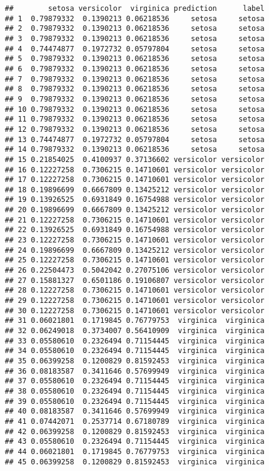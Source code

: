 \documentclass[]{article}
\begin{document}
\begin{verbatim}
##        setosa versicolor  virginica prediction      label
## 1  0.79879332  0.1390213 0.06218536     setosa     setosa
## 2  0.79879332  0.1390213 0.06218536     setosa     setosa
## 3  0.79879332  0.1390213 0.06218536     setosa     setosa
## 4  0.74474877  0.1972732 0.05797804     setosa     setosa
## 5  0.79879332  0.1390213 0.06218536     setosa     setosa
## 6  0.79879332  0.1390213 0.06218536     setosa     setosa
## 7  0.79879332  0.1390213 0.06218536     setosa     setosa
## 8  0.79879332  0.1390213 0.06218536     setosa     setosa
## 9  0.79879332  0.1390213 0.06218536     setosa     setosa
## 10 0.79879332  0.1390213 0.06218536     setosa     setosa
## 11 0.79879332  0.1390213 0.06218536     setosa     setosa
## 12 0.79879332  0.1390213 0.06218536     setosa     setosa
## 13 0.74474877  0.1972732 0.05797804     setosa     setosa
## 14 0.79879332  0.1390213 0.06218536     setosa     setosa
## 15 0.21854025  0.4100937 0.37136602 versicolor versicolor
## 16 0.12227258  0.7306215 0.14710601 versicolor versicolor
## 17 0.12227258  0.7306215 0.14710601 versicolor versicolor
## 18 0.19896699  0.6667809 0.13425212 versicolor versicolor
## 19 0.13926525  0.6931849 0.16754988 versicolor versicolor
## 20 0.19896699  0.6667809 0.13425212 versicolor versicolor
## 21 0.12227258  0.7306215 0.14710601 versicolor versicolor
## 22 0.13926525  0.6931849 0.16754988 versicolor versicolor
## 23 0.12227258  0.7306215 0.14710601 versicolor versicolor
## 24 0.19896699  0.6667809 0.13425212 versicolor versicolor
## 25 0.12227258  0.7306215 0.14710601 versicolor versicolor
## 26 0.22504473  0.5042042 0.27075106 versicolor versicolor
## 27 0.15881327  0.6501186 0.19106807 versicolor versicolor
## 28 0.12227258  0.7306215 0.14710601 versicolor versicolor
## 29 0.12227258  0.7306215 0.14710601 versicolor versicolor
## 30 0.12227258  0.7306215 0.14710601 versicolor versicolor
## 31 0.06021801  0.1719845 0.76779753  virginica  virginica
## 32 0.06249018  0.3734007 0.56410909  virginica  virginica
## 33 0.05580610  0.2326494 0.71154445  virginica  virginica
## 34 0.05580610  0.2326494 0.71154445  virginica  virginica
## 35 0.06399258  0.1200829 0.81592453  virginica  virginica
## 36 0.08183587  0.3411646 0.57699949  virginica  virginica
## 37 0.05580610  0.2326494 0.71154445  virginica  virginica
## 38 0.05580610  0.2326494 0.71154445  virginica  virginica
## 39 0.05580610  0.2326494 0.71154445  virginica  virginica
## 40 0.08183587  0.3411646 0.57699949  virginica  virginica
## 41 0.07442071  0.2537714 0.67180789  virginica  virginica
## 42 0.06399258  0.1200829 0.81592453  virginica  virginica
## 43 0.05580610  0.2326494 0.71154445  virginica  virginica
## 44 0.06021801  0.1719845 0.76779753  virginica  virginica
## 45 0.06399258  0.1200829 0.81592453  virginica  virginica
\end{verbatim}
\end{document}
